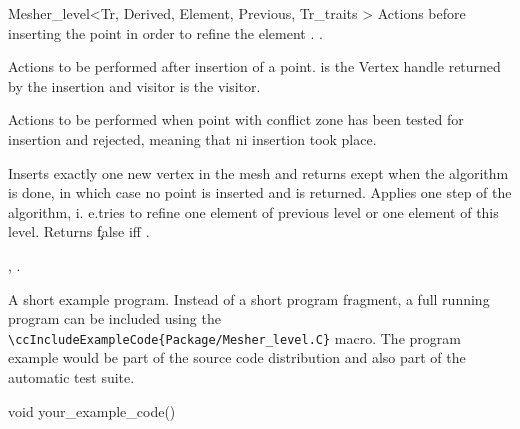 \begin{ccRefClass}{Mesher_level<Tr, Derived, Element, Previous,
Tr_traits >}
{
  Actions before inserting the point  in order to refine the
  element . 
 .}
 

{ Actions to be performed after insertion of a point.
   is the Vertex handle returned by the insertion
and visitor is the visitor.}

{ Actions  to be performed when  point   
  with conflict zone  has been tested for insertion and
rejected, meaning that ni insertion took place.}


 
\begin{ccAdvanced}
 
 {Inserts exactly one new vertex in the mesh  and returns 
 exept when the algorithm is done, in which case no point is inserted
and  is returned.}
\ccGlue  
 {Applies one step of the algorithm, i. e.tries to refine one element of
   previous level or one element of this level. Returns \c false iff 
   . }
\end{ccAdvanced}







\ccSeeAlso

,
.

\ccExample

A short example program.
Instead of a short program fragment, a full running program can be
included using the 
\verb|\ccIncludeExampleCode{Package/Mesher_level.C}| 
macro. The program example would be part of the source code distribution and
also part of the automatic test suite.

\begin{ccExampleCode}
void your_example_code() {
}
\end{ccExampleCode}


\end{ccRefClass}


